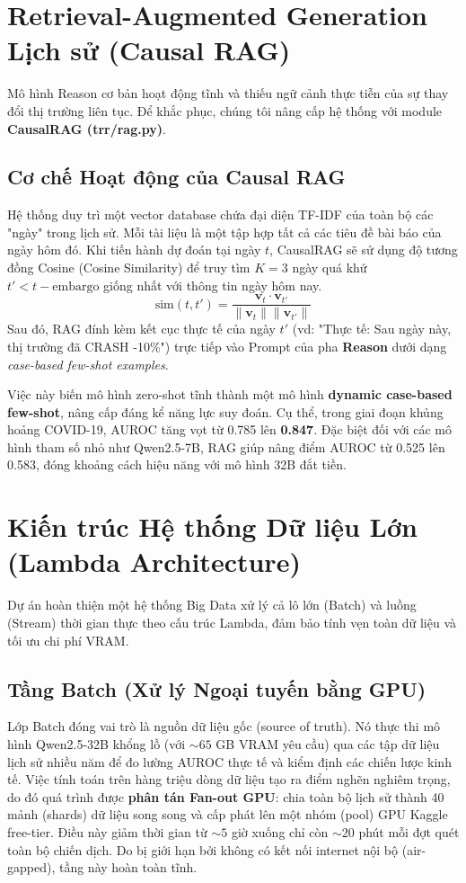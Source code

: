 \documentclass[11pt, a4paper]{article}
\begin{document}
\section{Retrieval-Augmented Generation Lịch sử (Causal RAG)}

Mô hình Reason cơ bản hoạt động tĩnh và thiếu ngữ cảnh thực tiễn của sự thay đổi thị trường liên tục. Để khắc phục, chúng tôi nâng cấp hệ thống với module \textbf{CausalRAG (\textbf{trr/rag.py})}. 

\subsection{Cơ chế Hoạt động của Causal RAG}
Hệ thống duy trì một vector database chứa đại diện TF-IDF của toàn bộ các "ngày" trong lịch sử. Mỗi tài liệu là một tập hợp tất cả các tiêu đề bài báo của ngày hôm đó. Khi tiến hành dự đoán tại ngày $t$, CausalRAG sẽ sử dụng độ tương đồng Cosine (Cosine Similarity) để truy tìm $K=3$ ngày quá khứ $t' < t - \text{embargo}$ giống nhất với thông tin ngày hôm nay.
\begin{equation}
    \text{sim}(t, t') = \frac{\mathbf{v}_t \cdot \mathbf{v}_{t'}}{\|\mathbf{v}_t\| \|\mathbf{v}_{t'}\|}
\end{equation}
Sau đó, RAG đính kèm kết cục thực tế của ngày $t'$ (vd: "Thực tế: Sau ngày này, thị trường đã CRASH -10\%") trực tiếp vào Prompt của pha \textbf{Reason} dưới dạng \textit{case-based few-shot examples}.

Việc này biến mô hình zero-shot tĩnh thành một mô hình \textbf{dynamic case-based few-shot}, nâng cấp đáng kể năng lực suy đoán. Cụ thể, trong giai đoạn khủng hoảng COVID-19, AUROC tăng vọt từ 0.785 lên \textbf{0.847}. Đặc biệt đối với các mô hình tham số nhỏ như Qwen2.5-7B, RAG giúp nâng điểm AUROC từ 0.525 lên 0.583, đóng khoảng cách hiệu năng với mô hình 32B đắt tiền.

\section{Kiến trúc Hệ thống Dữ liệu Lớn (Lambda Architecture)}

Dự án hoàn thiện một hệ thống Big Data xử lý cả lô lớn (Batch) và luồng (Stream) thời gian thực theo cấu trúc Lambda, đảm bảo tính vẹn toàn dữ liệu và tối ưu chi phí VRAM.

\subsection{Tầng Batch (Xử lý Ngoại tuyến bằng GPU)}
Lớp Batch đóng vai trò là nguồn dữ liệu gốc (source of truth). Nó thực thi mô hình Qwen2.5-32B khổng lồ (với $\sim 65$ GB VRAM yêu cầu) qua các tập dữ liệu lịch sử nhiều năm để đo lường AUROC thực tế và kiểm định các chiến lược kinh tế. Việc tính toán trên hàng triệu dòng dữ liệu tạo ra điểm nghẽn nghiêm trọng, do đó quá trình được \textbf{phân tán Fan-out GPU}: chia toàn bộ lịch sử thành 40 mảnh (shards) dữ liệu song song và cấp phát lên một nhóm (pool) GPU Kaggle free-tier. Điều này giảm thời gian từ $\sim 5$ giờ xuống chỉ còn $\sim 20$ phút mỗi đợt quét toàn bộ chiến dịch. Do bị giới hạn bởi không có kết nối internet nội bộ (air-gapped), tầng này hoàn toàn tĩnh.
\end{document}
